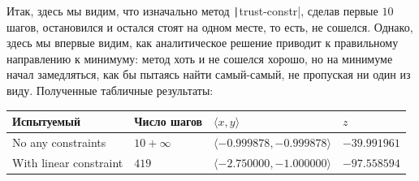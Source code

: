 \documentclass[12pt, a4paper, oneside, final]{article}
\begin{document}
	Итак, здесь мы видим, что изначально метод \texttt|trust-constr|, сделав первые $10$ шагов, остановился и остался стоят на одном месте, то есть, не сошелся.
	Однако, здесь мы впервые видим, как аналитическое решение приводит к правильному направлению к минимуму: метод хоть и не сошелся хорошо, но на минимуме начал замедляться, как бы пытаясь найти самый-самый, не пропуская ни один из виду.
	Полученные табличные результаты:
	\begin{table}[H]
		\centering
		\begin{tabular}{l|l|l|l}
			Испытуемый & Число шагов & $\langle x, y \rangle$ & $z$ \\ \hline
			No any constraints & $10 + \infty$ & $\langle -0.999878, -0.999878 \rangle$ & $-39.991961$ \\
			With linear constraint & $419$ & $\langle -2.750000, -1.000000 \rangle$ & $-97.558594$
		\end{tabular}
	\end{table}
\end{document}
